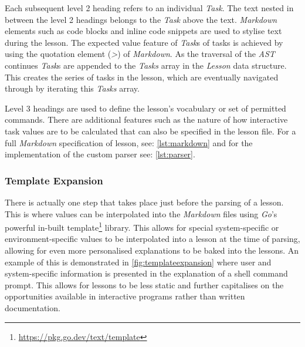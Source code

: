 Each subsequent level 2 heading refers to an individual \textit{Task}. The text
nested in between the level 2 headings belongs to the \textit{Task} above the text.
\textit{Markdown} elements such as code blocks and inline code snippets are
used to stylise text during the lesson. The expected value feature of
\textit{Task}s of tasks is achieved by using the quotation element (\textit{>})
of \textit{Markdown}. As the traversal of the \textit{AST} continues
\textit{Task}s are appended to the \textit{Tasks} array in the \textit{Lesson}
data structure. This creates the series of tasks in the lesson, which are
eventually navigated through by iterating this \textit{Tasks} array. 

Level 3 headings are used to define the lesson's vocabulary or set of
permitted commands. There are additional features such as the nature of how
interactive task values are to be calculated that can also be specified in the
lesson file. For a full \textit{Markdown} specification of lesson, see:
\autoref{lst:markdown} and for the implementation of the custom parser see: \autoref{lst:parser}. 

\subsubsection{Template Expansion}

There is actually one step that takes place just before the parsing of a
lesson. This is where values can be interpolated into the \textit{Markdown}
files using \textit{Go}'s powerful in-built
template\footnote{\url{https://pkg.go.dev/text/template}} library. This allows
for special system-specific or environment-specific values to be interpolated
into a lesson at the time of parsing, allowing for even more personalised
explanations to be baked into the lessons. An example of this is demonstrated
in \autoref{fig:templateexpansion} where user and system-specific information
is presented in the explanation of a shell command prompt. This allows for
lessons to be less static and further capitalises on the opportunities
available in interactive programs rather than written documentation.

